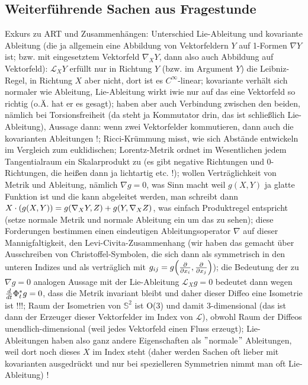 		\subsection*{Weiterführende Sachen aus Fragestunde}
Exkurs zu ART und Zusammenhängen: Unterschied Lie-Ableitung und kovariante Ableitung (die ja allgemein eine Abbildung von Vektorfeldern $Y$ auf 1-Formen $\nabla Y$ ist; bzw. mit eingesetztem Vektorfeld $\nabla_X Y$, dann also auch Abbildung auf Vektorfeld): $\mathcal{L}_X Y$ erfüllt nur in Richtung $Y$ (bzw. im Argument $Y$) die Leibniz-Regel, in Richtung $X$ aber nicht, dort ist es $C^\infty$-linear; kovariante verhält sich normaler wie Ableitung, Lie-Ableitung wirkt iwie nur auf das eine Vektorfeld so richtig (o.Ä. hat er es gesagt); haben aber auch Verbindung zwischen den beiden, nämlich bei Torsionsfreiheit (da steht ja Kommutator drin, das ist schließlich Lie-Ableitung), Aussage dann: wenn zwei Vektorfelder kommutieren, dann auch die kovarianten Ableitungen !; Ricci-Krümmung misst, wie sich Abstände entwickeln im Vergleich zum euklidischen; Lorentz-Metrik ordnet im Wesentlichen jedem Tangentialraum ein Skalarprodukt zu (es gibt negative Richtungen und 0-Richtungen, die heißen dann ja lichtartig etc. !); wollen Verträglichkeit von Metrik und Ableitung, nämlich $\nabla g = 0$, was Sinn macht weil $g(X, Y)$ ja glatte Funktion ist und die kann abgeleitet werden, man schreibt dann $X \cdot \qty(g(X, Y)) = g\qty(\nabla_X Y, Z) + g\qty(Y, \nabla_X Z)$, was einfach Produktregel entspricht (setze normale Metrik und normale Ableitung ein um das zu sehen); diese Forderungen bestimmen einen eindeutigen Ableitungsoperator $\nabla$ auf dieser Mannigfaltigkeit, den Levi-Civita-Zusammenhang (wir haben das gemacht über Ausschreiben von Christoffel-Symbolen, die sich dann als symmetrisch in den unteren Indizes und als verträglich mit $g_{ij} = g\qty(\pdv{x_i}, \pdv{x_j})$); die Bedeutung der zu $\nabla g = 0$ analogen Aussage mit der Lie-Ableitung $\mathcal{L}_X g = 0$ bedeutet dann wegen $\dv{t} \Phi_t^* g = 0$, dass die Metrik invariant bleibt und daher dieser Diffeo eine Isometrie ist !!!; Raum der Isometrien von $\mathbb{S}^2$ ist O(3) und damit 3-dimensional (das ist dann der Erzeuger dieser Vektorfelder im Index von $\mathcal{L}$), obwohl Raum der Diffeos unendlich-dimensional (weil jedes Vektorfeld einen Fluss erzeugt); Lie-Ableitungen haben also ganz andere Eigenschaften als $"$normale$"$ Ableitungen, weil dort noch dieses $X$ im Index steht (daher werden Sachen oft lieber mit kovarianten ausgedrückt und nur bei spezielleren Symmetrien nimmt man oft Lie-Ableitung) !

